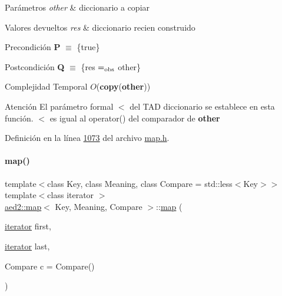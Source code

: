 \begin{DoxyParams}{Parámetros}
{\em other} & diccionario a copiar \\
\hline
\end{DoxyParams}

\begin{DoxyRetVals}{Valores devueltos}
{\em res} & diccionario recien construido\\
\hline
\end{DoxyRetVals}
\begin{DoxyPrecond}{Precondición}
{\bfseries P} $\equiv$ \{true\} 
\end{DoxyPrecond}
\begin{DoxyPostcond}{Postcondición}
{\bfseries Q} $\equiv$ \{res $=_{\rm obs}$ other\}
\end{DoxyPostcond}

\begin{DoxyDescription}
\item[Complejidad Temporal]$O$({\bfseries copy}({\bfseries other}))
\end{DoxyDescription}

\begin{DoxyAttention}{Atención}
El parámetro formal $<$ del T\+AD diccionario se establece en esta función. $<$ es igual al operator() del comparador de {\bfseries other} 
\end{DoxyAttention}


Definición en la línea \hyperlink{map_8h_source_l01073}{1073} del archivo \hyperlink{map_8h_source}{map.\+h}.

\mbox{\label{classaed2_1_1map_a5d336f3248572beb56be383dcc95cfeb_a5d336f3248572beb56be383dcc95cfeb}} 
\paragraph{\texorpdfstring{map()}{map()}\hspace{0.1cm}{\footnotesize\ttfamily [3/3]}}
{\footnotesize\ttfamily template$<$class Key, class Meaning, class Compare = std\+::less$<$\+Key$>$$>$ \\
template$<$class iterator $>$ \\
\hyperlink{classaed2_1_1map}{aed2\+::map}$<$ Key, Meaning, Compare $>$\+::\hyperlink{classaed2_1_1map}{map} (\begin{DoxyParamCaption}\item[{\hyperlink{classaed2_1_1map_1_1iterator}{iterator}}]{first,  }\item[{\hyperlink{classaed2_1_1map_1_1iterator}{iterator}}]{last,  }\item[{Compare}]{c = {\ttfamily Compare()} }\end{DoxyParamCaption})\hspace{0.3cm}{\ttfamily [inline]}}




